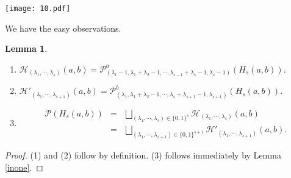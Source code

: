 \documentclass[10pt]{amsart}
\theoremstyle{theorems}
\newtheorem{Lemma}[Theorem]{Lemma}
\begin{document}
\centerline{\texttt{[image: 10.pdf]}}


We have the easy observations.

\medskip

\begin{Lemma}\label{basicdecom}

\begin{enumerate}[$(1)$]



  \item $\mathcal H_{(\lambda_1,\cdots,\lambda_s)}(a,b) = \mathcal P^{a}_{(\lambda_1-1,\lambda_1+\lambda_2-1,\cdots,\lambda_{s-1}+\lambda_s-1,\lambda_s-1)}(H_s(a,b))$.

  \item $\mathcal H'_{(\lambda_1,\cdots,\lambda_{s+1})}(a,b) = \mathcal P^{b}_{(\lambda_1,\lambda_1+\lambda_2-1,\cdots,\lambda_{s}+\lambda_{s+1}-1,\lambda_{s+1})}(H_s(a,b))$.

  \item  \[\begin{array}{ccl} \mathcal P(H_s(a,b))
  & = & \bigsqcup_{(\lambda_1,\cdots,\lambda_s)\in \{0,1\}^{s}}\mathcal H_{(\lambda_1,\cdots,\lambda_s)}(a,b)\\
  & = & \bigsqcup_{(\lambda_1,\cdots,\lambda_{s+1})\in \{0,1\}^{s+1}}\mathcal H'_{(\lambda_1,\cdots,\lambda_{s+1})}(a,b).
  \end{array}\]


\end{enumerate}


\end{Lemma}

\begin{proof}

(1) and (2) follow by definition. (3) follows immediately by Lemma \ref{inone}.
\end{proof}
\end{document}

